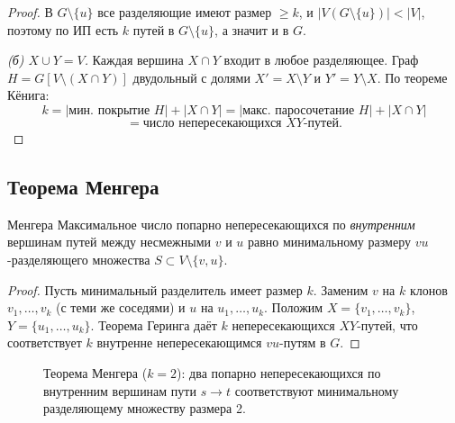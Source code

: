 \begin{proof}
  В $G\setminus\{u\}$ все разделяющие имеют размер $\ge k$, и $|V(G\setminus\{u\})|<|V|$,
  поэтому по ИП есть $k$ путей в $G\setminus\{u\}$, а значит и в $G$.

  \noindent\textit{(б) $X\cup Y = V$.}
  Каждая вершина $X\cap Y$ входит в любое разделяющее.
  Граф $H = G[V\setminus(X\cap Y)]$ двудольный с долями $X'=X\setminus Y$
  и $Y'=Y\setminus X$.
  По теореме Кёнига:
  \[
    k = |\text{мин. покрытие } H| + |X\cap Y|
      = |\text{макс. паросочетание } H| + |X\cap Y| \]
   \[
      = \text{число непересекающихся } XY\text{-путей.}
  \]
\end{proof}

\subsection{Теорема Менгера}

\begin{Theorem}{Менгера}{}
  Максимальное число попарно непересекающихся по \emph{внутренним} вершинам
  путей между несмежными $v$ и $u$ равно минимальному размеру
  $vu$-разделяющего множества $S \subset V\setminus\{v,u\}$.
\end{Theorem}

\begin{proof}
  Пусть минимальный разделитель имеет размер $k$.
  Заменим $v$ на $k$ клонов $v_1,\ldots,v_k$ (с теми же соседями) и $u$ на $u_1,\ldots,u_k$.
  Положим $X=\{v_1,\ldots,v_k\}$, $Y=\{u_1,\ldots,u_k\}$.
  Теорема Геринга даёт $k$ непересекающихся $XY$-путей,
  что соответствует $k$ внутренне непересекающимся $vu$-путям в $G$.
\end{proof}

\begin{figure}[H]
\centering
{}
\caption{Теорема Менгера ($k=2$): два попарно непересекающихся по внутренним вершинам
  пути $s\!\to\!t$ соответствуют минимальному разделяющему множеству размера 2.}
\end{figure}
